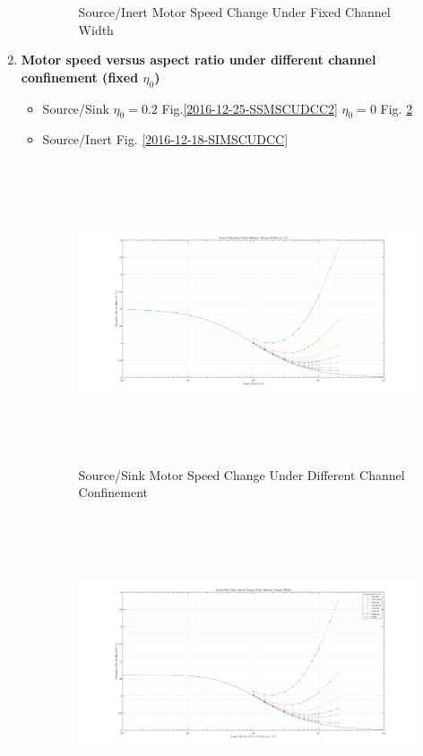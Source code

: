 \documentclass[fontsize=11pt, %
                             paper=a4, %
                             twoside, %
                             captions=tableheading,
                             index=totoc,
                             hyperref]{labbook}
\begin{document}
\begin{enumerate}
\begin{itemize}
\begin{figure}
\caption{Source/Inert Motor Speed Change Under Fixed Channel Width}\label{2016-12-18-SIMSCUFCW}
\end{figure}
\end{itemize}
\item \textbf{Motor speed versus aspect ratio under different channel confinement (fixed $\eta_0$)}\\
\begin{itemize}
\item Source/Sink $\eta_0=0.2$ Fig.\ref{2016-12-25-SSMSCUDCC2} $\eta_0=0$ Fig. \ref{2016-12-25-SSMSCUDCC0}
\item Source/Inert Fig. \ref{2016-12-18-SIMSCUDCC}

\begin{figure}
\centering
\includegraphics[width=\linewidth, height=3.5in]{2016-12-26-DiffChannel_SourceSink_eta0.png}
\caption{Source/Sink Motor Speed Change Under Different Channel Confinement}\label{2016-12-25-SSMSCUDCC0}
\end{figure}
\begin{figure}
\centering
\includegraphics[width=\linewidth, height=3.5in]{2016-12-25-DiffChannel_SourceSink_eta02.png}

\end{figure}
\end{itemize}
\end{enumerate}
\end{document}

